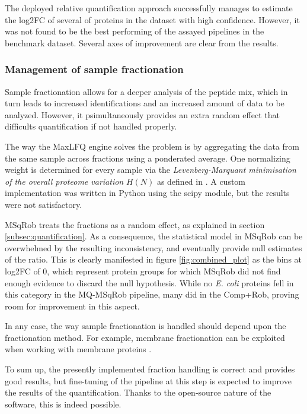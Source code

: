\documentclass[11pt, a4paper]{report}
\begin{document}
The deployed relative quantification approach successfully manages to estimate the \ac{log2FC} of several of proteins in the dataset with high confidence. However, it was not found to be the best performing of the assayed pipelines in the benchmark dataset. Several axes of improvement are clear from the results.

\subsubsection{Management of sample fractionation}

Sample fractionation allows for a deeper analysis of the peptide mix, which in turn leads to increased identifications and an increased amount of data to be analyzed. However, it psimultaneously provides an extra random effect that difficults quantification if not handled properly.

The way the MaxLFQ engine solves the problem is by aggregating the data from the same sample across fractions using a ponderated average. One normalizing weight is determined for every sample via the \textit{Levenberg-Marquant minimisation of the overall proteome variation} $H(N)$ as defined in \cite{Cox2014}. A custom implementation was written in Python using the scipy module, but the results were not satisfactory.

MSqRob treats the fractions as a random effect, as explained in section \ref{subsec:quantification}. As a consequence, the statistical model in MSqRob can be overwhelmed by the resulting inconsistency, and eventually provide null estimates of the ratio. This is clearly manifested in figure \ref{fig:combined_plot} as the bins at \ac{log2FC} of 0, which represent protein groups for which MSqRob did not find enough evidence to discard the null hypothesis. While no \textit{E. coli} proteins fell in this category in the MQ-MSqRob pipeline, many did in the Comp+Rob, proving room for improvement in this aspect.

In any case, the way sample fractionation is handled should depend upon the fractionation method. For example, membrane fractionation can be exploited when working with membrane proteins \cite{Marmagne2006}.

To sum up, the presently implemented fraction handling is correct and provides good results, but fine-tuning of the pipeline at this step is expected to improve the results of the quantification. Thanks to the open-source nature of the software, this is indeed possible.
\end{document}
